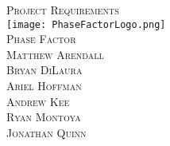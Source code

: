 \begin{titlepage}
\begin{center} 
\vspace*{2cm}
\textsc{\Huge Project Requirements}\\[2cm]


\texttt{[image: PhaseFactorLogo.png]}\\[.5cm]
\textsc{\LARGE Phase Factor}\\[3cm]

\textsc{\large Matthew Arendall}\\[0.2cm]
\textsc{\large Bryan DiLaura} \\[0.2cm]
\textsc{\large Ariel Hoffman} \\[0.2cm]
\textsc{\large Andrew Kee} \\[0.2cm]
\textsc{\large Ryan Montoya} \\[0.2cm]
\textsc{\large Jonathan Quinn} \\[0.2cm]

\end{center}
\end{titlepage}